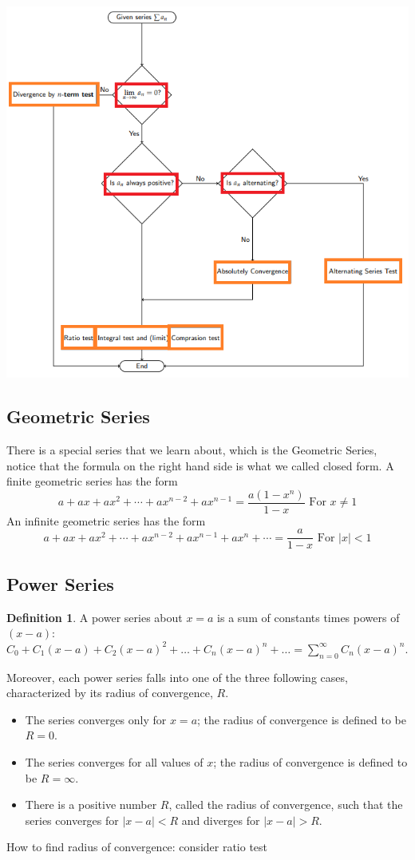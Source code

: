 \documentclass[12pt]{article}
\theoremstyle{definition}
\theoremstyle{definition}
\newtheorem{definition}{Definition}[section]
\theoremstyle{remark}
\theoremstyle{definition}
\theoremstyle{definition}
\theoremstyle{definition}
\begin{document}
\includegraphics[width=1\textwidth]{program.png}


\subsection{Geometric Series}
There is a special series that we learn about, which is the Geometric Series, notice that the formula on the right hand side is what we called closed form. 
A finite geometric series has the form
\[a + ax + ax^2 + \cdots + ax^{n−2} + ax^{n−1}=\frac{a(1-x^n)}{1-x}\text{ For } x \neq 1\]
An infinite geometric series has the form
\[a + ax + ax^2 + \cdots + ax^{n−2} + ax^{n−1}+ax^n +\cdots=\frac{a}{1-x}\text{ For } |x| < 1\]

\newpage

\subsection{Power Series}
\begin{definition}
	A power series about $x = a$ is a sum of constants times powers of $(x - a)$: \\
	$C_0 + C_1(x - a) + C_2(x - a)^2 + \ldots + C_n(x - a)^n + \ldots =	\sum_{n
	=0}^{\infty}	C_n(x - a)^n$.
\end{definition}
Moreover, each power series falls into one of the three following cases, characterized by its radius of convergence, $R$.
\begin{itemize}
\item The series converges only for $x = a$; the radius of convergence is defined to be $R = 0$.
\item The series converges for all values of $x$; the radius of convergence is defined to be
$R = \infty$.
\item There is a positive number $R$, called the radius of convergence, such that the series
converges for $|x - a| < R$ and diverges for $|x - a| > R$. 
\end{itemize}
How to find radius of convergence: consider ratio test
\end{document}
